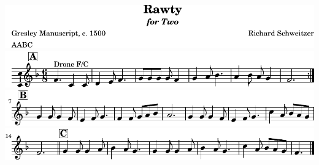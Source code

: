 \includegraphics{b8/lily-7931eef9-1}%
\ifx\betweenLilyPondSystem \undefined
  \linebreak
\else
  \expandafter{}%
\fi
\includegraphics{b8/lily-7931eef9-2}%
\ifx\betweenLilyPondSystem \undefined
  \linebreak
\else
  \expandafter{}%
\fi
\includegraphics{b8/lily-7931eef9-3}%
\ifx\betweenLilyPondSystem \undefined
  \linebreak
\else
  \expandafter{}%
\fi
\includegraphics{b8/lily-7931eef9-4}%

